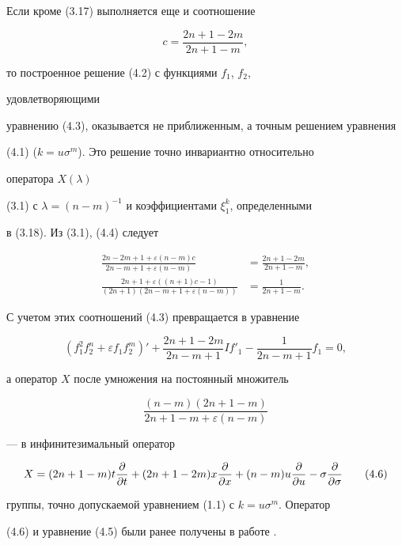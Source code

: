 \begin{notenonum}


Если кроме (3.17) выполняется еще и соотношение


\begin{equation}


c=\frac{2n+1-2m}{2n+1-m},\tag{4.4}


\end{equation}


то построенное решение (4.2) с функциями $f_1$, $f_2$,


удовлетворяющими


уравнению (4.3), оказывается не приближенным, а точным решением уравнения


(4.1) ($k=u\sigma^m$). Это решение точно инвариантно относительно


оператора $X(\lambda)$


(3.1) с $\lambda=(n-m)^{-1}$ и коэффициентами $\xi^k_1$, определенными


в (3.18). Из (3.1), (4.4) следует


\begin{align*}


\frac{2n-2m+1+\varepsilon(n-m)c}{2n-m+1+\varepsilon(n-m)}&=


\frac{2n+1-2m}{2n+1-m},\\


\frac{2n+1+\varepsilon((n+1)c-1)}{(2n+1)(2n-m+1+\varepsilon(n-m))}&=


\frac{1}{2n+1-m}.


\end{align*}


С учетом этих соотношений (4.3) превращается в уравнение


\begin{equation}


(f^2_1f^n_2+\varepsilon f_1f^m_2)'+


\frac{2n+1-2m}{2n-m+1}If'_1-\frac{1}{2n-m+1}f_1=0,\tag{4.5}


\end{equation}


а оператор $X$ после умножения на постоянный множитель


$$


\frac{(n-m)(2n+1-m)}{2n+1-m+\varepsilon(n-m)}


$$


--- в инфинитезимальный оператор


\begin{equation}


X=(2n+1-m)t\frac{\pa}{\pa t}+(2n+1-2m)x\frac{\pa}{\pa x}


+(n-m)u\frac{\pa}{\pa u}-\sigma\frac{\pa}{\pa\sigma}\tag{4.6}


\end{equation}


группы, точно допускаемой уравнением (1.1) с $k=u\sigma^m$. Оператор


(4.6) и уравнение (4.5) были ранее получены в работе \cite{Sal}.


\end{notenonum}





